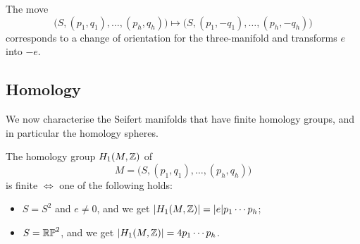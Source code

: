 \begin{rem} \label{reverse:rem}
The move
$$\big(S,(p_1,q_1), \ldots, (p_h,q_h)\big) \longmapsto \big(S,(p_1,-q_1), \ldots, (p_h,-q_h)\big) $$
corresponds to a change of orientation for the three-manifold and transforms $e$ into $-e$.
\end{rem}


\subsection{Homology} \label{Seifert:homology:sphere:subsection}
We now characterise the Seifert manifolds that have finite homology groups, and in particular the homology spheres.

\begin{prop} \label{Seifert:homology:prop}
The homology group $H_1(M, \mathbb{Z})$ of 
$$M=\big(S,(p_1,q_1), \ldots, (p_h,q_h)\big)$$
is finite $\Longleftrightarrow$ one of the following holds:
\begin{itemize}
\item $S=S^2$ and $e\neq 0$, and we get $|H_1(M,\mathbb{Z})| = |e|p_1\cdots p_h$;
\item $S=\mathbb{RP}^2$, and we get $|H_1(M,\mathbb{Z})| = 4p_1\cdots p_h$.
\end{itemize}
\end{prop}
